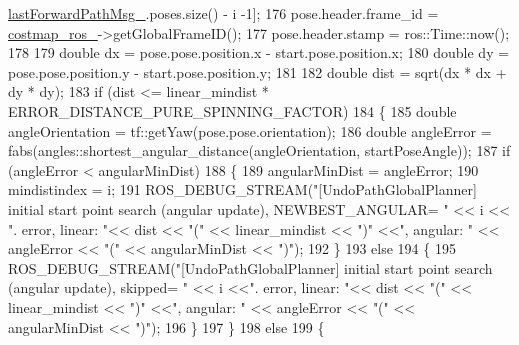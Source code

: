 \begin{DoxyCode}
      \hyperlink{classcl__move__base__z_1_1undo__path__global__planner_1_1UndoPathGlobalPlanner_a9a4a6e40f5b6cb5f77dedbc5b6170871}{lastForwardPathMsg\_}.poses.size() - i -1];
176                     pose.header.frame\_id = \hyperlink{classcl__move__base__z_1_1undo__path__global__planner_1_1UndoPathGlobalPlanner_ab63eeb465e3ae989a6edcc4d059cf8f0}{costmap\_ros\_}->getGlobalFrameID();
177                     pose.header.stamp = ros::Time::now();
178 
179                     \textcolor{keywordtype}{double} dx = pose.pose.position.x - start.pose.position.x;
180                     \textcolor{keywordtype}{double} dy = pose.pose.position.y - start.pose.position.y;
181 
182                     \textcolor{keywordtype}{double} dist = sqrt(dx * dx + dy * dy);
183                     \textcolor{keywordflow}{if} (dist <= linear\_mindist * ERROR\_DISTANCE\_PURE\_SPINNING\_FACTOR)
184                     \{
185                         \textcolor{keywordtype}{double} angleOrientation = tf::getYaw(pose.pose.orientation);
186                         \textcolor{keywordtype}{double} angleError = fabs(angles::shortest\_angular\_distance(angleOrientation, 
      startPoseAngle));
187                         \textcolor{keywordflow}{if} (angleError < angularMinDist)
188                         \{
189                             angularMinDist = angleError;
190                             mindistindex = i;
191                             ROS\_DEBUG\_STREAM(\textcolor{stringliteral}{"[UndoPathGlobalPlanner] initial start point search (angular
       update), NEWBEST\_ANGULAR= "} << i << \textcolor{stringliteral}{". error, linear: "}<<  dist << \textcolor{stringliteral}{"("} << linear\_mindist << \textcolor{stringliteral}{")"} <<\textcolor{stringliteral}{", angular:
       "} << angleError << \textcolor{stringliteral}{"("} << angularMinDist << \textcolor{stringliteral}{")"});
192                         \}
193                         \textcolor{keywordflow}{else}
194                         \{
195                             ROS\_DEBUG\_STREAM(\textcolor{stringliteral}{"[UndoPathGlobalPlanner] initial start point search (angular
       update), skipped= "} << i <<\textcolor{stringliteral}{". error, linear: "}<<  dist << \textcolor{stringliteral}{"("} << linear\_mindist << \textcolor{stringliteral}{")"} <<\textcolor{stringliteral}{", angular: "}  << 
      angleError << \textcolor{stringliteral}{"("} << angularMinDist << \textcolor{stringliteral}{")"});
196                         \}
197                     \}
198                     \textcolor{keywordflow}{else}
199                     \{

\end{DoxyCode}
